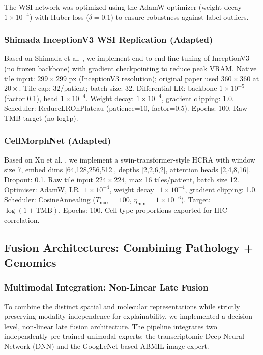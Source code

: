 \documentclass[11pt,a4paper]{article}
\begin{document}
The WSI network was optimized using the AdamW optimizer (weight decay $1\times 10^{-4}$) with Huber loss ($\delta=0.1$) to ensure robustness against label outliers.

\subsubsection{Shimada InceptionV3 WSI Replication (Adapted)}
Based on Shimada et al. \cite{shimada2021}, we implement end-to-end fine-tuning of InceptionV3 (no frozen backbone) with gradient checkpointing to reduce peak VRAM. Native tile input: $299\times299$ px (InceptionV3 resolution); original paper used $360\times360$ at $20\times$. Tile cap: 32/patient; batch size: 32. Differential LR: backbone $1\times10^{-5}$ (factor 0.1), head $1\times10^{-4}$. Weight decay: $1\times10^{-4}$, gradient clipping: 1.0. Scheduler: ReduceLROnPlateau (patience=10, factor=0.5). Epochs: 100. Raw TMB target (no log1p).

\subsubsection{CellMorphNet (Adapted)}
Based on Xu et al. \cite{xu2024cellmorphnet}, we implement a swin-transformer-style HCRA with window size 7, embed dims [64,128,256,512], depths [2,2,6,2], attention heads [2,4,8,16]. Dropout: 0.1. Raw tile input $224\times224$, max 16 tiles/patient, batch size 12. Optimiser: AdamW, LR=$1\times10^{-4}$, weight decay=$1\times10^{-4}$, gradient clipping: 1.0. Scheduler: CosineAnnealing ($T_{\max}=100$, $\eta_{\min}=1\times10^{-6}$). Target: $\log(1+\text{TMB})$. Epochs: 100. Cell-type proportions exported for IHC correlation.

\subsection{Fusion Architectures: Combining Pathology + Genomics}
\label{subsec:fusion}

\subsubsection{Multimodal Integration: Non-Linear Late Fusion}
To combine the distinct spatial and molecular representations while strictly preserving modality independence for explainability, we implemented a decision-level, non-linear late fusion architecture. The pipeline integrates two independently pre-trained unimodal experts: the transcriptomic Deep Neural Network (DNN) and the GoogLeNet-based ABMIL image expert.
\end{document}
